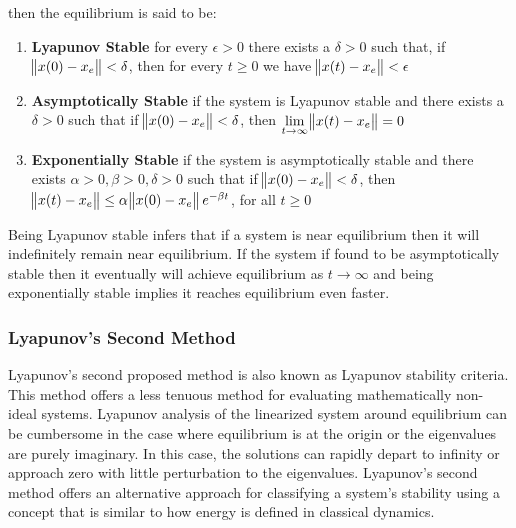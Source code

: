 then the equilibrium is said to be:
\begin{enumerate}
 \item \textbf{Lyapunov Stable} \newline
 for every $\epsilon > 0$ there exists a $\delta > 0$ such that, if \: $\norm{x(0) - x_e} < \delta$, then for every $t \geq 0$ we have  $ \norm{x(t) - x_e} < \epsilon$ 
 \item \textbf{Asymptotically Stable} \newline
 if the system is Lyapunov stable and there exists a $\delta > 0$ such that if \: $\norm{x(0) - x_e}  < \delta$, then $\displaystyle \lim_{t\to \infty} \norm{x(t)-x_e} =0$
 \item \textbf{Exponentially Stable} \newline
 if the system is asymptotically stable and there exists $\alpha > 0, \beta > 0, \delta > 0$ such that if $\norm{x(0)-x_e}<\delta$, then \:$\norm{x(t)-x_e} \leq \alpha \norm{x(0)-x_e} e^{-\beta t}$, for all $t \geq 0$
\end{enumerate}

Being Lyapunov stable infers that if a system is near equilibrium then it will indefinitely remain near equilibrium.  If the system if found to be asymptotically stable then it eventually will achieve equilibrium as $t\to \infty$ and being exponentially stable implies it reaches equilibrium even faster.

\subsubsection{Lyapunov's Second Method}
 
Lyapunov's second proposed method is also known as Lyapunov stability criteria.  This method offers a less tenuous method for evaluating mathematically non-ideal systems.  Lyapunov analysis of the linearized system around equilibrium can be cumbersome in the case where equilibrium is at the origin or the eigenvalues are purely imaginary.  In this case, the solutions can rapidly depart to infinity or approach zero with little perturbation to the eigenvalues.  Lyapunov's second method offers an alternative approach for classifying a system's stability using a concept that is similar to how energy is defined in classical dynamics.

